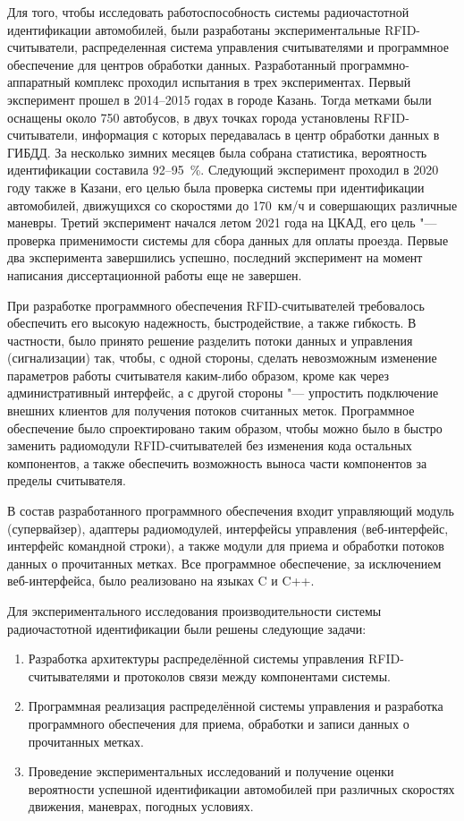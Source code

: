 Для того, чтобы исследовать работоспособность системы радиочастотной идентификации автомобилей, были разработаны экспериментальные RFID-считыватели, распределенная система управления считывателями и программное обеспечение для центров обработки данных. Разработанный программно-аппаратный комплекс проходил испытания в трех экспериментах. Первый эксперимент прошел в 2014--2015 годах в городе Казань. Тогда метками были оснащены около 750 автобусов, в двух точках города установлены RFID-считыватели, информация с которых передавалась в центр обработки данных в ГИБДД. За несколько зимних месяцев была собрана статистика, вероятность идентификации составила 92--95~\%. Следующий эксперимент проходил в 2020 году также в Казани, его целью была проверка системы при идентификации автомобилей, движущихся со скоростями до 170~км/ч и совершающих различные маневры. Третий эксперимент начался летом 2021 года на ЦКАД, его цель "--- проверка применимости системы для сбора данных для оплаты проезда. Первые два эксперимента завершились успешно, последний эксперимент на момент написания диссертационной работы еще не завершен.

При разработке программного обеспечения RFID-считывателей требовалось обеспечить его высокую надежность, быстродействие, а также гибкость. В частности, было принято решение разделить потоки данных и управления (сигнализации) так, чтобы, с одной стороны, сделать невозможным изменение параметров работы считывателя каким-либо образом, кроме как через административный интерфейс, а с другой стороны "--- упростить подключение внешних клиентов для получения потоков считанных меток. Программное обеспечение было спроектировано таким образом, чтобы можно было в быстро заменить радиомодули RFID-считывателей без изменения кода остальных компонентов, а также обеспечить возможность выноса части компонентов за пределы считывателя.

В состав разработанного программного обеспечения входит управляющий модуль (супервайзер), адаптеры радиомодулей, интерфейсы управления (веб-интерфейс, интерфейс командной строки), а также модули для приема и обработки потоков данных о прочитанных метках. Все программное обеспечение, за исключением веб-интерфейса, было реализовано на языках C и C++.

Для экспериментального исследования производительности системы радиочастотной идентификации были решены следующие задачи:

\begin{enumerate}
	\item Разработка архитектуры распределённой системы управления RFID-считывателями и протоколов связи между компонентами системы.
	\item Программная реализация распределённой системы управления и разработка программного обеспечения для приема, обработки и записи данных о прочитанных метках.
	\item Проведение экспериментальных исследований и получение оценки вероятности успешной идентификации автомобилей при различных скоростях движения, маневрах, погодных условиях.
\end{enumerate}

